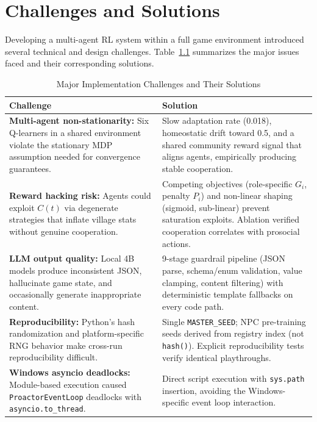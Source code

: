 \documentclass[12pt, a4paper, oneside]{report}
\begin{document}
\chapter{Challenges and Solutions}
\label{chap:challenges}

Developing a multi-agent RL system within a full game environment introduced several technical and design challenges. Table~\ref{tab:challenges} summarizes the major issues faced and their corresponding solutions.

\begin{table}[H]
\centering
\caption{Major Implementation Challenges and Their Solutions}
\label{tab:challenges}
\begin{tabularx}{\textwidth}{|X|X|}
\hline
\textbf{Challenge} & \textbf{Solution} \\
\hline
\textbf{Multi-agent non-stationarity:} Six Q-learners in a shared environment violate the stationary MDP assumption needed for convergence guarantees.
& Slow adaptation rate (0.018), homeostatic drift toward 0.5, and a shared community reward signal that aligns agents, empirically producing stable cooperation. \\
\hline
\textbf{Reward hacking risk:} Agents could exploit $C(t)$ via degenerate strategies that inflate village stats without genuine cooperation.
& Competing objectives (role-specific $G_i$, penalty $P_i$) and non-linear shaping (sigmoid, sub-linear) prevent saturation exploits. Ablation verified cooperation correlates with prosocial actions. \\
\hline
\textbf{LLM output quality:} Local 4B models produce inconsistent JSON, hallucinate game state, and occasionally generate inappropriate content.
& 9-stage guardrail pipeline (JSON parse, schema/enum validation, value clamping, content filtering) with deterministic template fallbacks on every code path. \\
\hline
\textbf{Reproducibility:} Python's hash randomization and platform-specific RNG behavior make cross-run reproducibility difficult.
& Single \texttt{MASTER\_SEED}; NPC pre-training seeds derived from registry index (not \texttt{hash()}). Explicit reproducibility tests verify identical playthroughs. \\
\hline
\textbf{Windows asyncio deadlocks:} Module-based execution caused \texttt{ProactorEventLoop} deadlocks with \texttt{asyncio.to\_thread}.
& Direct script execution with \texttt{sys.path} insertion, avoiding the Windows-specific event loop interaction. \\
\hline
\end{tabularx}
\end{table}
\end{document}
